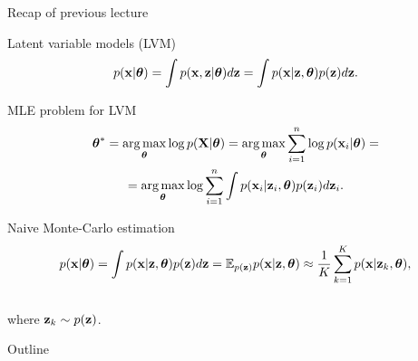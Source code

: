 \begin{frame}{Recap of previous lecture}
	\begin{block}{Latent variable models (LVM)}
		\vspace{-0.3cm}
		\[
		p(\mathbf{x} | \boldsymbol{\theta}) = \int p(\mathbf{x}, \mathbf{z} | \boldsymbol{\theta}) d\mathbf{z} = \int p(\mathbf{x} | \mathbf{z}, \boldsymbol{\theta}) p(\mathbf{z}) d\mathbf{z}.
		\]
	\end{block}
	\begin{block}{MLE problem for LVM}
		\vspace{-0.7cm}
		\begin{multline*}
			\boldsymbol{\theta}^* = \operatorname*{arg\,max}_{\boldsymbol{\theta}} \log p(\mathbf{X}| \boldsymbol{\theta}) = \operatorname*{arg\,max}_{\boldsymbol{\theta}} \sum_{i=1}^n \log p(\mathbf{x}_i | \boldsymbol{\theta}) = \\ = \operatorname*{arg\,max}_{\boldsymbol{\theta}} \log \sum_{i=1}^n \int p(\mathbf{x}_i| \mathbf{z}_i, \boldsymbol{\theta}) p(\mathbf{z}_i) d\mathbf{z}_i.
		\end{multline*}
		\vspace{-0.7cm}
	\end{block}
	\begin{block}{Naive Monte-Carlo estimation}
		\vspace{-0.7cm}
		\[
		p(\mathbf{x} | \boldsymbol{\theta}) = \int p(\mathbf{x} | \mathbf{z}, \boldsymbol{\theta}) p(\mathbf{z}) d\mathbf{z} = \mathbb{E}_{p(\mathbf{z})} p(\mathbf{x} | \mathbf{z}, \boldsymbol{\theta}) \approx \frac{1}{K} \sum_{k=1}^{K} p(\mathbf{x} | \mathbf{z}_k, \boldsymbol{\theta}),
		\]
		\vspace{-0.5cm} \\
		where $\mathbf{z}_k \sim p(\mathbf{z})$. 
	\end{block}
\end{frame}
\begin{frame}{Outline}
	\tableofcontents
\end{frame}
